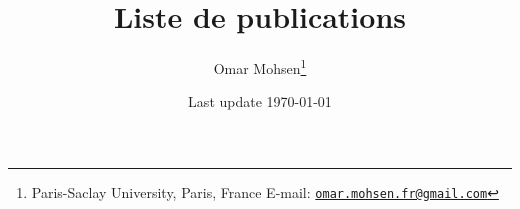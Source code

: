 \documentclass[a4paper, 13pt]{article}
\begin{document}
\title{Liste de publications}
\author{Omar Mohsen\footnote{{\footnotesize
Paris-Saclay University, Paris, France
\vskip-2pt E-mail: \href{mailto:omar.mohsen.fr@gmail.com}{\texttt{omar.mohsen.fr@gmail.com}}}}}
\date{Last update \today}
\maketitle
  \nocite{MohsenBlowup}
  \nocite{MohsenGrpTangent}
  \nocite{MohsenIndex}
  \nocite{MohsenIndexMuens}
  \nocite{MohsenTangentCone}
  \nocite{MohsenMaxHypo}
  \nocite{MohsenChernSimons}
  \nocite{MohsenWitten}
  \nocite{MohsenConnesShwartz}
  \nocite{MohsenConvolutionSingularFoliations}
  \nocite{MohsenWodizki}


\begin{refcontext}[sorting=nyt]
\printbibliography[heading=none]
\end{refcontext}
\end{document}
